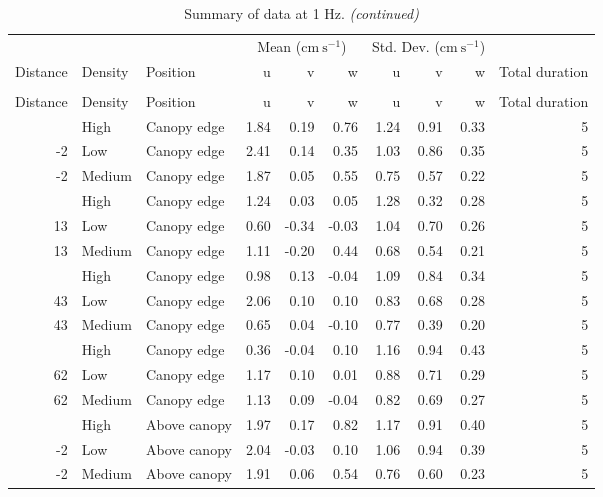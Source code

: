 \documentclass[10pt,]{article}
\begin{document}
\begin{longtable}{rllrrrrrrr}
\caption{\label{tab:unnamed-chunk-2}Summary of data at 1 Hz.}\\
\toprule
\multicolumn{3}{c}{ } & \multicolumn{3}{c}{Mean ($\text{cm}~\text{s}^{-1}$)} & \multicolumn{3}{c}{Std. Dev. ($\text{cm}~\text{s}^{-1}$)} \\
\cmidrule(l{2pt}r{2pt}){4-6} \cmidrule(l{2pt}r{2pt}){7-9}
Distance & Density & Position & u & v & w & u & v & w & Total duration\\
\midrule
\endfirsthead
\caption[]{\label{tab:unnamed-chunk-2}Summary of data at 1 Hz. \textit{(continued)}}\\
\toprule
Distance & Density & Position & u & v & w & u & v & w & Total duration\\
\midrule
\endhead
\
\endfoot
\bottomrule
\endlastfoot
-2 & High & Canopy edge & 1.84 & 0.19 & 0.76 & 1.24 & 0.91 & 0.33 & 5\\
-2 & Low & Canopy edge & 2.41 & 0.14 & 0.35 & 1.03 & 0.86 & 0.35 & 5\\
-2 & Medium & Canopy edge & 1.87 & 0.05 & 0.55 & 0.75 & 0.57 & 0.22 & 5\\
\addlinespace
13 & High & Canopy edge & 1.24 & 0.03 & 0.05 & 1.28 & 0.32 & 0.28 & 5\\
13 & Low & Canopy edge & 0.60 & -0.34 & -0.03 & 1.04 & 0.70 & 0.26 & 5\\
13 & Medium & Canopy edge & 1.11 & -0.20 & 0.44 & 0.68 & 0.54 & 0.21 & 5\\
\addlinespace
43 & High & Canopy edge & 0.98 & 0.13 & -0.04 & 1.09 & 0.84 & 0.34 & 5\\
43 & Low & Canopy edge & 2.06 & 0.10 & 0.10 & 0.83 & 0.68 & 0.28 & 5\\
43 & Medium & Canopy edge & 0.65 & 0.04 & -0.10 & 0.77 & 0.39 & 0.20 & 5\\
\addlinespace
62 & High & Canopy edge & 0.36 & -0.04 & 0.10 & 1.16 & 0.94 & 0.43 & 5\\
62 & Low & Canopy edge & 1.17 & 0.10 & 0.01 & 0.88 & 0.71 & 0.29 & 5\\
62 & Medium & Canopy edge & 1.13 & 0.09 & -0.04 & 0.82 & 0.69 & 0.27 & 5\\
\addlinespace
-2 & High & Above canopy & 1.97 & 0.17 & 0.82 & 1.17 & 0.91 & 0.40 & 5\\
-2 & Low & Above canopy & 2.04 & -0.03 & 0.10 & 1.06 & 0.94 & 0.39 & 5\\
-2 & Medium & Above canopy & 1.91 & 0.06 & 0.54 & 0.76 & 0.60 & 0.23 & 5\\

\end{longtable}
\end{document}
